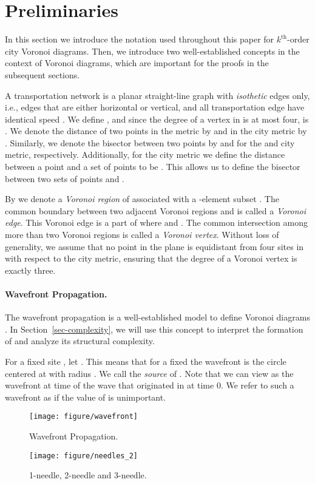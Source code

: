 \documentclass[11pt]{llncs}
\newcommand{\kth}{\ensuremath{k^{\mathrm{th}}}\xspace}
\newcommand{\kthorder}{\kth-order\xspace}
\begin{document}
\section{Preliminaries}\label{sec-prelim}
In this section we introduce the notation used throughout this paper
for \kthorder city Voronoi diagrams.
Then, we introduce two well-established concepts in the context of Voronoi diagrams,
which are important for the proofs in the subsequent sections.

A transportation network is a planar straight-line graph  with  \emph{isothetic} edges only, i.e., edges that are either horizontal or vertical,
and all transportation edge have identical speed .
We define , and since the degree of a vertex in  is at most four,
 is .
We denote the distance of two points in the  metric by  and in the city metric by .
Similarly, we denote the bisector between two points by  and  for the  and city metric, respectively.
Additionally, for the city metric we define the distance between a point  and a set of points  to be
.
This allows us to define the bisector  between two sets of points  and  .




By  we denote a \emph{Voronoi region} of  associated with a -element subset .
The common boundary between two adjacent Voronoi regions  and 
is called a \emph{Voronoi edge}.
This Voronoi edge is a part of 
where  and  \cite{Lee-82}.
The common intersection among more than two Voronoi regions
is called a \emph{Voronoi vertex}.
Without loss of generality,
we assume that no point in the plane is equidistant from four sites in  with respect to the city metric,
ensuring that the degree of a Voronoi vertex is
exactly three.


\paragraph{\textbf{Wavefront Propagation.}}
The wavefront propagation
is a well-established model to define Voronoi diagrams \cite{AAP-04}.
In Section~\ref{sec-complexity},
we will use this concept to interpret the formation of 
and analyze its structural complexity.


For a fixed site , let .
This means that for a fixed  the wavefront  is the circle centered at  with radius .
We call  the \emph{source} of .
Note that we can view  as the wavefront at time  of the wave that originated in  at time 0.
We refer to such a wavefront as  if the value of  is unimportant.


\begin{figure}[t]
\begin{center}
\begin{minipage}[b]{0.5\textwidth}
 \centering
 \texttt{[image: figure/wavefront]}
 \caption{Wavefront Propagation.}
 \label{fig-wavefront}
\end{minipage}
\hfill
\begin{minipage}[b]{0.49\textwidth}
 \centering
 \texttt{[image: figure/needles\_2]}
 \caption{ 1-needle, 2-needle and 3-needle. }
 \label{fig-needles}
\end{minipage}
\end{center}
\end{figure}
\end{document}
